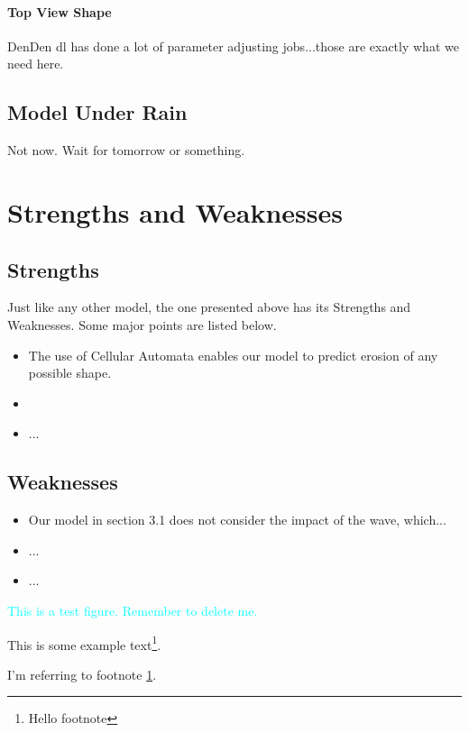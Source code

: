 \documentclass[12pt]{article}
\begin{document}
\paragraph{Top View Shape}
DenDen dl has done a lot of parameter adjusting jobs...those are exactly what we need here.
\subsection{Model Under Rain}
Not now. Wait for tomorrow or something.
\section{Strengths and Weaknesses}
\subsection{Strengths}
Just like any other model, the one presented above has its Strengths and Weaknesses. Some major points are listed below.
\begin{itemize}
	\item [1)] 
	The use of Cellular Automata enables our model to predict erosion of any possible shape. 
	\item [2)]
	
	\item [3)]
	...
\end{itemize}
\subsection{Weaknesses}
\begin{itemize}
	\item [1)] 
	Our model in section 3.1 does not consider the impact of the wave, which...  
	\item [2)]
	...
	\item [3)]
	...
\end{itemize}

\textcolor{cyan}{This is a test figure. Remember to delete me.}



This is some example text\footnote{\label{myfootnote}Hello footnote}.

I'm referring to footnote \ref{myfootnote}.


\newpage
\begin{appendix}
    \listoffigures
    \listoftables
    \listoflistings
    \printbibliography
\end{appendix}
\end{document}
